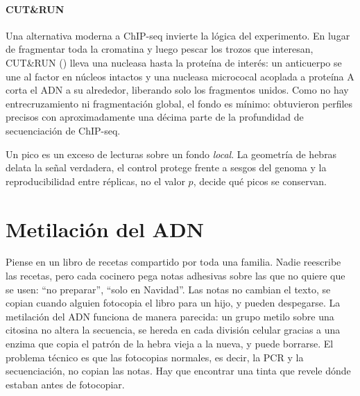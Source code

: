 \paragraph{CUT\&RUN} Una alternativa moderna a ChIP-seq invierte la lógica del experimento. En lugar de fragmentar toda la cromatina y luego pescar los trozos que interesan, CUT\&RUN () lleva una nucleasa hasta la proteína de interés: un anticuerpo se une al factor en núcleos intactos y una nucleasa micrococal acoplada a proteína A corta el ADN a su alrededor, liberando solo los fragmentos unidos. Como no hay entrecruzamiento ni fragmentación global, el fondo es mínimo: \textcite{c13-skene2017} obtuvieron perfiles precisos con aproximadamente una décima parte de la profundidad de secuenciación de ChIP-seq.

\begin{ideaclave}
Un pico es un exceso de lecturas sobre un fondo \emph{local}. La geometría de hebras delata la señal verdadera, el control protege frente a sesgos del genoma y la reproducibilidad entre réplicas, no el valor $p$, decide qué picos se conservan.
\end{ideaclave}

\section{Metilación del ADN}\label{sec:13-metil}

\begin{intuicion}
Piense en un libro de recetas compartido por toda una familia. Nadie reescribe las recetas, pero cada cocinero pega notas adhesivas sobre las que no quiere que se usen: ``no preparar'', ``solo en Navidad''. Las notas no cambian el texto, se copian cuando alguien fotocopia el libro para un hijo, y pueden despegarse. La metilación del ADN funciona de manera parecida: un grupo metilo sobre una citosina no altera la secuencia, se hereda en cada división celular gracias a una enzima que copia el patrón de la hebra vieja a la nueva, y puede borrarse. El problema técnico es que las fotocopias normales, es decir, la PCR y la secuenciación, no copian las notas. Hay que encontrar una tinta que revele dónde estaban antes de fotocopiar.
\end{intuicion}

